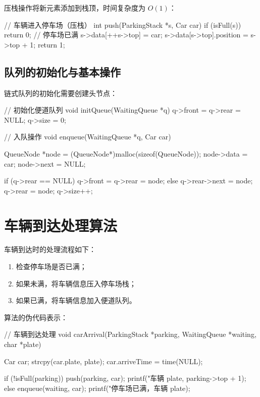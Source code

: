 \documentclass[a4paper,12pt,twoside]{ctexrep}
\begin{document}
压栈操作将新元素添加到栈顶，时间复杂度为 $O(1)$：

\begin{codeblock}
// 车辆进入停车场（压栈）
int push(ParkingStack *s, Car car) {
    if (isFull(s)) {
        return 0;  // 停车场已满
    }
    s->data[++s->top] = car;
    s->data[s->top].position = s->top + 1;
    return 1;
}
\end{codeblock}

\subsection{队列的初始化与基本操作}

链式队列的初始化需要创建头节点：

\begin{codeblock}
// 初始化便道队列
void initQueue(WaitingQueue *q) {
    q->front = q->rear = NULL;
    q->size = 0;
}

// 入队操作
void enqueue(WaitingQueue *q, Car car) {
    QueueNode *node = (QueueNode*)malloc(sizeof(QueueNode));
    node->data = car;
    node->next = NULL;
    
    if (q->rear == NULL) {
        q->front = q->rear = node;
    } else {
        q->rear->next = node;
        q->rear = node;
    }
    q->size++;
}
\end{codeblock}

\section{车辆到达处理算法}

车辆到达时的处理流程如下：

\begin{enumerate}
  \item 检查停车场是否已满；
  \item 如果未满，将车辆信息压入停车场栈；
  \item 如果已满，将车辆信息加入便道队列。
\end{enumerate}

算法的伪代码表示：

\begin{codeblock}
// 车辆到达处理
void carArrival(ParkingStack *parking, 
                WaitingQueue *waiting, 
                char *plate) {
    Car car;
    strcpy(car.plate, plate);
    car.arriveTime = time(NULL);
    
    if (!isFull(parking)) {
        push(parking, car);
        printf("车辆 %
               plate, parking->top + 1);
    } else {
        enqueue(waiting, car);
        printf("停车场已满，车辆 %
               plate);
    }
}
\end{codeblock}
\end{document}
